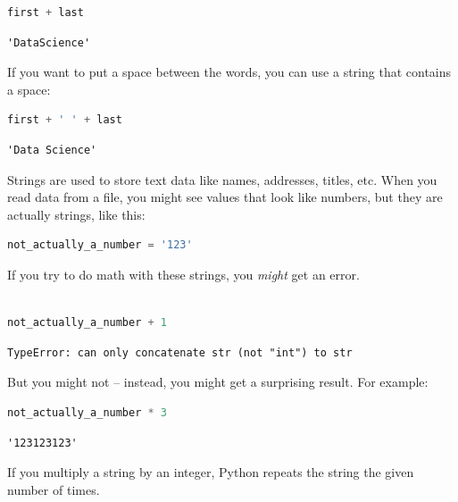 \begin{lstlisting}[language=Python,style=source]
first + last
\end{lstlisting}

\begin{lstlisting}[style=output]
'DataScience'
\end{lstlisting}

If you want to put a space between the words, you can use a string that
contains a space:

\begin{lstlisting}[language=Python,style=source]
first + ' ' + last
\end{lstlisting}

\begin{lstlisting}[style=output]
'Data Science'
\end{lstlisting}

Strings are used to store text data like names, addresses, titles, etc.
When you read data from a file, you might see values that look like
numbers, but they are actually strings, like this:

\begin{lstlisting}[language=Python,style=source]
not_actually_a_number = '123'
\end{lstlisting}

If you try to do math with these strings, you \emph{might} get an error.

\begin{lstlisting}[language=Python,style=source]
%%expect TypeError

not_actually_a_number + 1
\end{lstlisting}

\begin{lstlisting}[style=output]
TypeError: can only concatenate str (not "int") to str
\end{lstlisting}

But you might not -- instead, you might get a surprising result. For
example:

\begin{lstlisting}[language=Python,style=source]
not_actually_a_number * 3
\end{lstlisting}

\begin{lstlisting}[style=output]
'123123123'
\end{lstlisting}

If you multiply a string by an integer, Python repeats the string the
given number of times.

